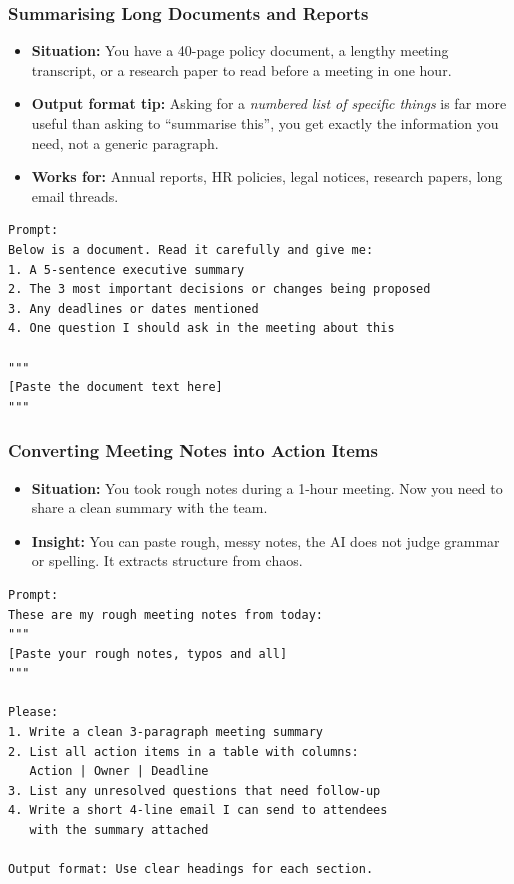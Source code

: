 \begin{frame}[fragile]\frametitle{Summarising Long Documents and Reports}

    \begin{itemize}
        \item \textbf{Situation:} You have a 40-page policy document, a lengthy meeting transcript, or a research paper to read before a meeting in one hour.
        \item \textbf{Output format tip:} Asking for a \emph{numbered list of specific things} is far more useful than asking to ``summarise this'', you get exactly the information you need, not a generic paragraph.
        \item \textbf{Works for:} Annual reports, HR policies, legal notices, research papers, long email threads.
    \end{itemize}
		
\begin{lstlisting}[language=HTML]
Prompt:
Below is a document. Read it carefully and give me:
1. A 5-sentence executive summary
2. The 3 most important decisions or changes being proposed
3. Any deadlines or dates mentioned
4. One question I should ask in the meeting about this

"""
[Paste the document text here]
"""
\end{lstlisting}



\end{frame}


\begin{frame}[fragile]\frametitle{Converting Meeting Notes into Action Items}

    \begin{itemize}
        \item \textbf{Situation:} You took rough notes during a 1-hour meeting. Now you need to share a clean summary with the team.
        \item \textbf{Insight:} You can paste rough, messy notes, the AI does not judge grammar or spelling. It extracts structure from chaos.
    \end{itemize}

\begin{lstlisting}[language=HTML]
Prompt:
These are my rough meeting notes from today:
"""
[Paste your rough notes, typos and all]
"""

Please:
1. Write a clean 3-paragraph meeting summary
2. List all action items in a table with columns: 
   Action | Owner | Deadline
3. List any unresolved questions that need follow-up
4. Write a short 4-line email I can send to attendees 
   with the summary attached

Output format: Use clear headings for each section.
\end{lstlisting}


\end{frame}


